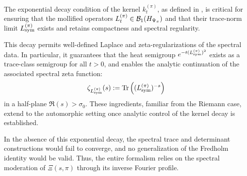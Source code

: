\begin{remark}
\label{rem:generalized_trace_decay}
The exponential decay condition of the kernel \( k_t^{(\pi)} \), as defined in , is critical for ensuring that the mollified operators \( L_t^{(\pi)} \in \mathcal{B}_1(H_{\Psi_{\pi}}) \) and that their trace-norm limit \( L_{\mathrm{sym}}^{(\pi)} \) exists and retains compactness and spectral regularity.

This decay permits well-defined Laplace and zeta-regularizations of the spectral data. In particular, it guarantees that the heat semigroup \( e^{-t (L_{\mathrm{sym}}^{(\pi)})^2} \) exists as a trace-class semigroup for all \( t > 0 \), and enables the analytic continuation of the associated spectral zeta function:
\[
\zeta_{L_{\mathrm{sym}}^{(\pi)}}(s) := \operatorname{Tr}\left( (L_{\mathrm{sym}}^{(\pi)})^{-s} \right)
\]
in a half-plane \( \Re(s) > \sigma_0 \). These ingredients, familiar from the Riemann case, extend to the automorphic setting once analytic control of the kernel decay is established.

In the absence of this exponential decay, the spectral trace and determinant constructions would fail to converge, and no generalization of the Fredholm identity would be valid. Thus, the entire formalism relies on the spectral moderation of \( \Xi(s, \pi) \) through its inverse Fourier profile.
\end{remark}
